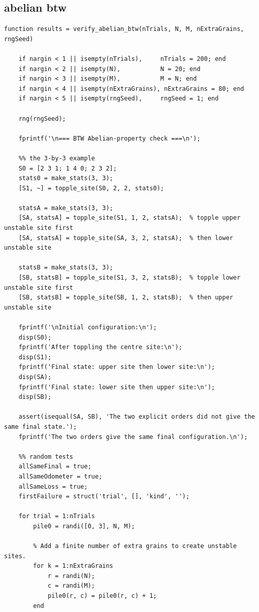 \documentclass{article}
\begin{document}
\clearpage

\subsection{abelian btw}

\begin{lstlisting}
function results = verify_abelian_btw(nTrials, N, M, nExtraGrains, rngSeed)

    if nargin < 1 || isempty(nTrials),     nTrials = 200; end
    if nargin < 2 || isempty(N),           N = 20; end
    if nargin < 3 || isempty(M),           M = N; end
    if nargin < 4 || isempty(nExtraGrains), nExtraGrains = 80; end
    if nargin < 5 || isempty(rngSeed),     rngSeed = 1; end

    rng(rngSeed);

    fprintf('\n=== BTW Abelian-property check ===\n');

    %% the 3-by-3 example
    S0 = [2 3 1; 1 4 0; 2 3 2];
    stats0 = make_stats(3, 3);
    [S1, ~] = topple_site(S0, 2, 2, stats0);

    statsA = make_stats(3, 3);
    [SA, statsA] = topple_site(S1, 1, 2, statsA);  % topple upper unstable site first
    [SA, statsA] = topple_site(SA, 3, 2, statsA);  % then lower unstable site

    statsB = make_stats(3, 3);
    [SB, statsB] = topple_site(S1, 3, 2, statsB);  % topple lower unstable site first
    [SB, statsB] = topple_site(SB, 1, 2, statsB);  % then upper unstable site

    fprintf('\nInitial configuration:\n');
    disp(S0);
    fprintf('After toppling the centre site:\n');
    disp(S1);
    fprintf('Final state: upper site then lower site:\n');
    disp(SA);
    fprintf('Final state: lower site then upper site:\n');
    disp(SB);

    assert(isequal(SA, SB), 'The two explicit orders did not give the same final state.');
    fprintf('The two orders give the same final configuration.\n');

    %% random tests
    allSameFinal = true;
    allSameOdometer = true;
    allSameLoss = true;
    firstFailure = struct('trial', [], 'kind', '');

    for trial = 1:nTrials
        pile0 = randi([0, 3], N, M);

        % Add a finite number of extra grains to create unstable sites.
        for k = 1:nExtraGrains
            r = randi(N);
            c = randi(M);
            pile0(r, c) = pile0(r, c) + 1;
        end


\end{lstlisting}
\end{document}

